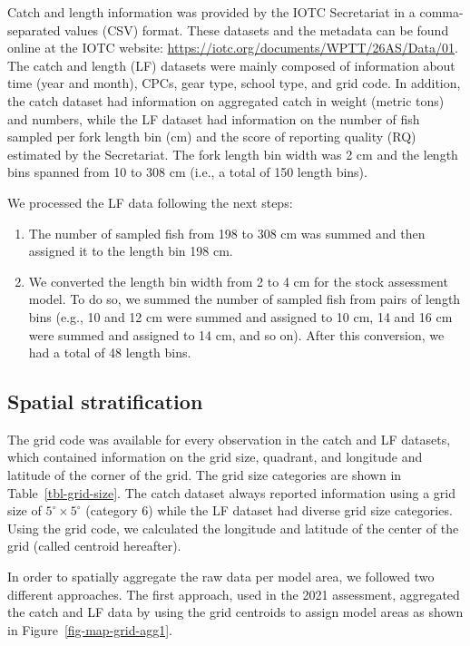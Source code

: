 \documentclass[
]{scrartcl}
\providecommand{\tightlist}{%
  \setlength{\itemsep}{0pt}\setlength{\parskip}{0pt}}\usepackage{longtable,booktabs,array}
\begin{document}
Catch and length information was provided by the IOTC Secretariat in a
comma-separated values (CSV) format. These datasets and the metadata can
be found online at the IOTC website:
\url{https://iotc.org/documents/WPTT/26AS/Data/01}. The catch and length
(LF) datasets were mainly composed of information about time (year and
month), CPCs, gear type, school type, and grid code. In addition, the
catch dataset had information on aggregated catch in weight (metric
tons) and numbers, while the LF dataset had information on the number of
fish sampled per fork length bin (cm) and the score of reporting quality
(RQ) estimated by the Secretariat. The fork length bin width was 2 cm
and the length bins spanned from 10 to 308 cm (i.e., a total of 150
length bins).

We processed the LF data following the next steps:

\begin{enumerate}
\def\labelenumi{\arabic{enumi}.}
\tightlist
\item
  The number of sampled fish from 198 to 308 cm was summed and then
  assigned it to the length bin 198 cm.
\item
  We converted the length bin width from 2 to 4 cm for the stock
  assessment model. To do so, we summed the number of sampled fish from
  pairs of length bins (e.g., 10 and 12 cm were summed and assigned to
  10 cm, 14 and 16 cm were summed and assigned to 14 cm, and so on).
  After this conversion, we had a total of 48 length bins.
\end{enumerate}

\subsection{Spatial stratification}\label{spatial-stratification}

The grid code was available for every observation in the catch and LF
datasets, which contained information on the grid size, quadrant, and
longitude and latitude of the corner of the grid. The grid size
categories are shown in Table~\ref{tbl-grid-size}. The catch dataset
always reported information using a grid size of
\(5^\circ\times 5^\circ\) (category 6) while the LF dataset had diverse
grid size categories. Using the grid code, we calculated the longitude
and latitude of the center of the grid (called centroid hereafter).

In order to spatially aggregate the raw data per model area, we followed
two different approaches. The first approach, used in the 2021
assessment, aggregated the catch and LF data by using the grid centroids
to assign model areas as shown in Figure~\ref{fig-map-grid-agg1}.
\end{document}
